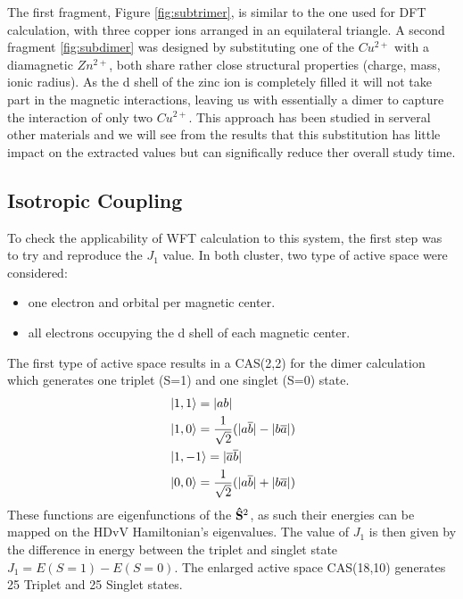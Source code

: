 \documentclass[12pt]{report}
\numberwithin{equation}{section}
\begin{document}
The first fragment, Figure \ref{fig:subtrimer}, is similar to the one used for DFT calculation, with three copper ions arranged in an equilateral triangle. 
A second fragment \ref{fig:subdimer} was designed by substituting one of the $Cu^{2+}$ with a diamagnetic $Zn^{2+}$, both share rather close structural properties (charge, mass, ionic radius).
As the d shell of the zinc ion is completely filled it will not take part in the magnetic interactions, leaving us with essentially a dimer to capture the interaction of only two $Cu^{2+}$. 
This approach has been studied in serveral other materials and we will see from the results that this substitution has little impact on the extracted values but can significally reduce ther overall study time.

\subsection{Isotropic Coupling}

To check the applicability of WFT calculation to this system, the first step was to try and reproduce the $J_1$ value.
In both cluster, two type of active space were considered:
\begin{itemize}
    \item one electron and orbital per magnetic center.
    \item all electrons occupying the d shell of each magnetic center.
\end{itemize}

The first type of active space results in a CAS(2,2) for the dimer calculation which generates one triplet (S=1) and one singlet (S=0) state.
\begin{align}
    &\ket{1,1}=|ab|\\
    &\ket{1,0}=\frac{1}{\sqrt{2}}(|a\overline{b}|-|b\overline{a}|)\\
    &\ket{1,-1}=|\overline{a}\overline{b}|\\
    &\ket{0,0}=\frac{1}{\sqrt{2}}(|a\overline{b}|+|b\overline{a}|)
\end{align}
These functions are eigenfunctions of the $\vb{\hat{S}}^2$, as such their energies can be mapped on the HDvV Hamiltonian's eigenvalues.
The value of $J_1$ is then given by the difference in energy between the triplet and singlet state $J_1=E(S=1)-E(S=0)$.
The enlarged active space CAS(18,10) generates 25 Triplet and 25 Singlet states.
\end{document}
